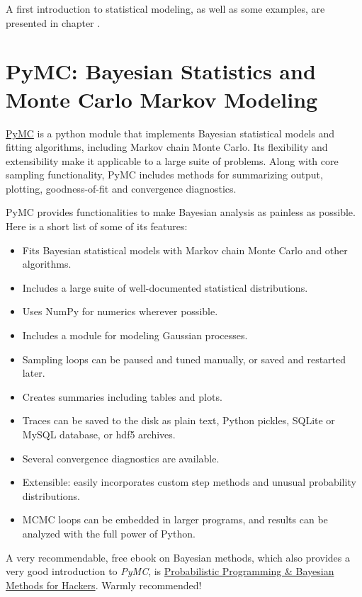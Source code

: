 A first introduction to statistical modeling, as well as some examples, are presented in chapter .

\section{PyMC: Bayesian Statistics and Monte Carlo Markov Modeling}

\href{http://pymc-devs.github.io/pymc/}{PyMC} is a python module that implements Bayesian statistical models and fitting algorithms, including Markov chain Monte Carlo. Its flexibility and extensibility make it applicable to a large suite of problems. Along with core sampling functionality, PyMC includes methods for summarizing output, plotting, goodness-of-fit and convergence diagnostics.

PyMC provides functionalities to make Bayesian analysis as painless as possible. Here is a short list of some of its features:

\begin{itemize}
    \item Fits Bayesian statistical models with Markov chain Monte Carlo and other algorithms.
    \item Includes a large suite of well-documented statistical distributions.
    \item Uses NumPy for numerics wherever possible.
    \item Includes a module for modeling Gaussian processes.
    \item Sampling loops can be paused and tuned manually, or saved and restarted later.
    \item Creates summaries including tables and plots.
    \item Traces can be saved to the disk as plain text, Python pickles, SQLite or MySQL database, or hdf5 archives.
    \item Several convergence diagnostics are available.
    \item Extensible: easily incorporates custom step methods and unusual probability distributions.
    \item MCMC loops can be embedded in larger programs, and results can be analyzed with the full power of Python.
\end{itemize}

A very recommendable, free ebook on Bayesian methods, which also provides a very good introduction to \emph{PyMC}, is \href{http://camdavidsonpilon.github.io/Probabilistic-Programming-and-Bayesian-Methods-for-Hackers/}{
Probabilistic Programming \& Bayesian Methods for Hackers}. Warmly recommended!

